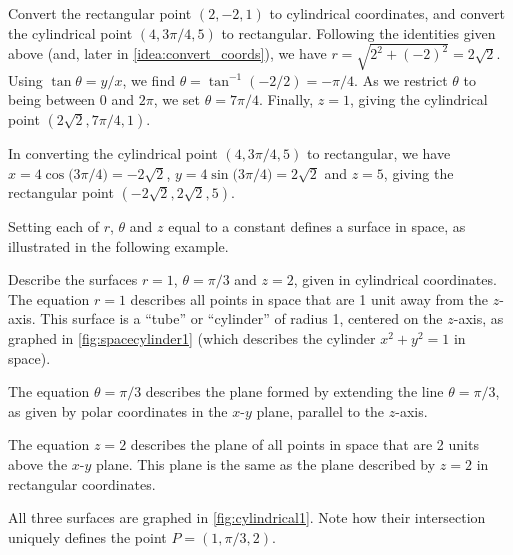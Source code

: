 

\begin{example}\label{ex_cylindrical4}
Convert the rectangular point $(2,-2,1)$ to cylindrical coordinates, and convert the cylindrical point $(4,3\pi/4,5)$ to rectangular.
\solution
Following the identities given above (and, later in \autoref{idea:convert_coords}), we have $r = \sqrt{2^2+(-2)^2} = 2\sqrt{2}$. Using $\tan\theta = y/x$, we find $\theta = \tan^{-1}(-2/2) =-\pi/4$. As we restrict $\theta$ to being between $0$ and $2\pi$, we set $\theta = 7\pi/4$. Finally, $z = 1$, giving the cylindrical point $(2\sqrt2,7\pi/4,1)$.

In converting the cylindrical point $(4,3\pi/4,5)$ to rectangular, we have
$x = 4\cos\bigl(3\pi/4\bigr) = -2\sqrt{2}$, $y = 4\sin\bigl(3\pi/4\bigr) = 2\sqrt{2}$ and $z=5$, giving the rectangular point $(-2\sqrt{2},2\sqrt{2},5)$.
\end{example}

Setting each of $r$, $\theta$ and $z$ equal to a constant defines a surface in space, as illustrated in the following example.


\begin{example}\label{ex_cylindrical1}
Describe the surfaces $r=1$, $\theta = \pi/3$ and $z=2$, given in cylindrical coordinates.
\solution
The equation $r=1$ describes all points in space that are 1 unit away from the $z$-axis. This surface is a ``tube'' or ``cylinder'' of radius 1, centered on the $z$-axis, as graphed in \autoref{fig:spacecylinder1} (which describes the cylinder $x^2+y^2=1$ in space). 

The equation $\theta=\pi/3$ describes the plane formed by extending the line $\theta=\pi/3$, as given by polar coordinates in the $x$-$y$ plane, parallel to the $z$-axis.

The equation $z=2$ describes the plane of all points in space that are 2 units above the $x$-$y$ plane. This plane is the same as the plane described by $z=2$ in rectangular coordinates.

All three surfaces are graphed in \autoref{fig:cylindrical1}. Note how their intersection uniquely defines the point $P=(1,\pi/3,2)$.
\end{example}


